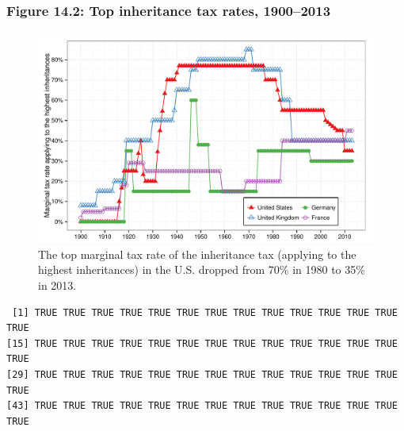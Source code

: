 \documentclass[t]{beamer}\usepackage[]{graphicx}\usepackage[]{color}
\makeatletter
\newenvironment{kframe}{%
 \def\at@end@of@kframe{}%
 \ifinner\ifhmode%
  \def\at@end@of@kframe{\end{minipage}}%
  \begin{minipage}{\columnwidth}%
 \fi\fi%
 \def\FrameCommand##1{\hskip\@totalleftmargin \hskip-\fboxsep
 \colorbox{shadecolor}{##1}\hskip-\fboxsep
     \hskip-\linewidth \hskip-\@totalleftmargin \hskip\columnwidth}%
 \MakeFramed {\advance\hsize-\width
   \@totalleftmargin\z@ \linewidth\hsize
   \@setminipage}}%
 {\par\unskip\endMakeFramed%
 \at@end@of@kframe}
\newenvironment{knitrout}{}{} %
\makeatother
\begin{document}
\begin{frame}[label=Figure_14_2]
\frametitle{Figure 14.2: Top inheritance tax rates, 1900--2013}
\begin{figure}[t]
\begin{minipage}[b]{\textwidth}
\centering
\begin{knitrout}\footnotesize
{}\color{fgcolor}

{\centering \includegraphics[width=1\linewidth]{figures/color/Figure_14_2} 

}



\end{knitrout}
\caption{The top marginal tax rate of the inheritance tax (applying to the highest inheritances) in the U.S. dropped from 70\% in 1980 to 35\% in 2013.}
\end{minipage}
\end{figure}
\end{frame}




\begin{knitrout}\footnotesize
{}\color{fgcolor}\begin{kframe}
\begin{verbatim}
 [1] TRUE TRUE TRUE TRUE TRUE TRUE TRUE TRUE TRUE TRUE TRUE TRUE TRUE TRUE
[15] TRUE TRUE TRUE TRUE TRUE TRUE TRUE TRUE TRUE TRUE TRUE TRUE TRUE TRUE
[29] TRUE TRUE TRUE TRUE TRUE TRUE TRUE TRUE TRUE TRUE TRUE TRUE TRUE TRUE
[43] TRUE TRUE TRUE TRUE TRUE TRUE TRUE TRUE TRUE TRUE TRUE TRUE TRUE TRUE
\end{verbatim}
\end{kframe}
\end{knitrout}
\end{document}

